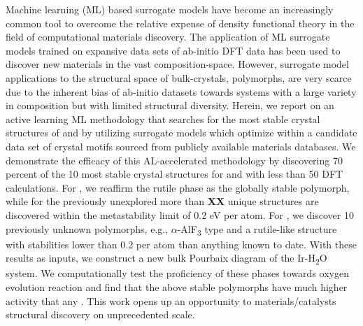 %



%
Machine learning (ML) based surrogate models have become an increasingly common tool to overcome the relative expense of density functional theory in the field of computational materials discovery.
%
The application of ML surrogate models trained on expansive data sets of ab-initio DFT data has been used to discover new materials in the vast composition-space.
%
However, surrogate model applications to the structural space of bulk-crystals,  polymorphs,
are very scarce due to the inherent bias of ab-initio datasets towards systems with a large variety in composition but with limited structural diversity.
%
Herein, we report on an active learning ML methodology that searches for the most stable crystal structures of \IrOtwo and \IrOthree by utilizing surrogate models which optimize within a candidate data set of crystal motifs sourced from publicly available materials databases.
We demonstrate the efficacy of this AL-accelerated methodology by discovering 70 percent of the 10 most stable crystal structures for \IrOtwo and \IrOthree with less than 50 DFT calculations.
For \IrOtwo, we reaffirm the rutile phase as the globally stable polymorph,
while for the previously unexplored \IrOthree more than {\bf XX} unique structures are discovered within the metastability limit of 0.2 eV per atom.
%
For \IrOthree, we discover 10 previously unknown polymorphs, e.g.,
$\alpha$-AlF\textsubscript{3} type and a rutile-like \IrOthree structure with stabilities lower than 0.2 per atom than anything known to date.
%
With these results as inputs, we construct a new bulk Pourbaix diagram of the Ir-H\textsubscript{2}O system.
%
We computationally test the proficiency of these phases towards oxygen evolution reaction and find that the above stable \IrOthree polymorphs have much higher activity that any \IrOtwo.
%
This work opens up an opportunity to materials/catalysts structural discovery on unprecedented scale.
